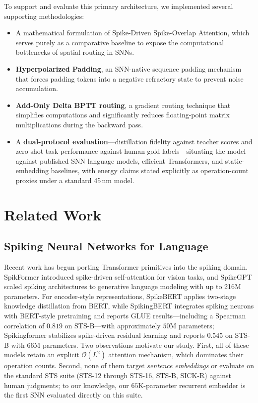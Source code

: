 \documentclass[preprint,12pt]{elsarticle}
\begin{document}
To support and evaluate this primary architecture, we implemented several supporting methodologies:
\begin{itemize}
    \item A mathematical formulation of Spike-Driven Spike-Overlap Attention, which serves purely as a comparative baseline to expose the computational bottlenecks of spatial routing in SNNs.
    \item \textbf{Hyperpolarized Padding}, an SNN-native sequence padding mechanism that forces padding tokens into a negative refractory state to prevent noise accumulation.
    \item \textbf{Add-Only Delta BPTT routing}, a gradient routing technique that simplifies computations and significantly reduces floating-point matrix multiplications during the backward pass.
    \item A \textbf{dual-protocol evaluation}—distillation fidelity against teacher scores and zero-shot task performance against human gold labels—situating the model against published SNN language models, efficient Transformers, and static-embedding baselines, with energy claims stated explicitly as operation-count proxies under a standard 45\,nm model.
\end{itemize}

\section{Related Work}

\subsection{Spiking Neural Networks for Language}
Recent work has begun porting Transformer primitives into the spiking domain. SpikFormer \citep{zhou2023spikformer} introduced spike-driven self-attention for vision tasks, and SpikeGPT \citep{zhu2023spikegpt} scaled spiking architectures to generative language modeling with up to 216M parameters. For encoder-style representations, SpikeBERT \citep{lv2023spikebert} applies two-stage knowledge distillation from BERT, while SpikingBERT \citep{bal2024spikingbert} integrates spiking neurons with BERT-style pretraining and reports GLUE results—including a Spearman correlation of $0.819$ on STS-B—with approximately $50$M parameters; Spikingformer \citep{zhou2025spikingformer} stabilizes spike-driven residual learning and reports $0.545$ on STS-B with $66$M parameters. Two observations motivate our study. First, all of these models retain an explicit $\mathcal{O}(L^2)$ attention mechanism, which dominates their operation counts. Second, none of them target \emph{sentence embeddings} or evaluate on the standard STS suite (STS-12 through STS-16, STS-B, SICK-R) against human judgments; to our knowledge, our $65$K-parameter recurrent embedder is the first SNN evaluated directly on this suite.
\end{document}
